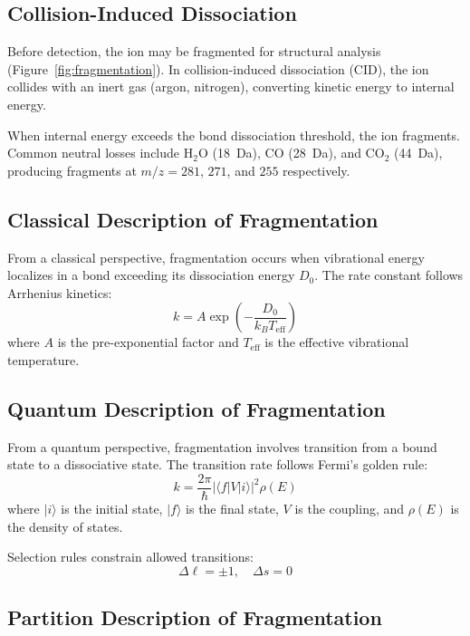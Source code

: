 \documentclass[12pt,a4paper]{article}
\theoremstyle{remark}
\begin{document}
\subsection{Collision-Induced Dissociation}

Before detection, the ion may be fragmented for structural analysis (Figure~\ref{fig:fragmentation}). In collision-induced dissociation (CID), the ion collides with an inert gas (argon, nitrogen), converting kinetic energy to internal energy.

When internal energy exceeds the bond dissociation threshold, the ion fragments. Common neutral losses include H$_2$O (18~Da), CO (28~Da), and CO$_2$ (44~Da), producing fragments at $m/z = 281$, $271$, and $255$ respectively.

\subsection{Classical Description of Fragmentation}

From a classical perspective, fragmentation occurs when vibrational energy localizes in a bond exceeding its dissociation energy $D_0$. The rate constant follows Arrhenius kinetics:
\begin{equation}
k = A \exp\left(-\frac{D_0}{k_B T_{\text{eff}}}\right)
\end{equation}
where $A$ is the pre-exponential factor and $T_{\text{eff}}$ is the effective vibrational temperature.

\subsection{Quantum Description of Fragmentation}

From a quantum perspective, fragmentation involves transition from a bound state to a dissociative state. The transition rate follows Fermi's golden rule:
\begin{equation}
k = \frac{2\pi}{\hbar} |\langle f | V | i \rangle|^2 \rho(E)
\end{equation}
where $|i\rangle$ is the initial state, $|f\rangle$ is the final state, $V$ is the coupling, and $\rho(E)$ is the density of states.

Selection rules constrain allowed transitions:
\begin{equation}
\Delta \ell = \pm 1, \quad \Delta s = 0
\end{equation}

\subsection{Partition Description of Fragmentation}
\end{document}
